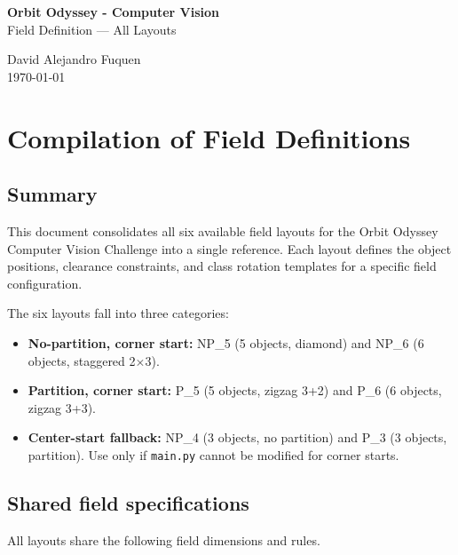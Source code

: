 \documentclass[a4]{article}
\begin{document}
\thispagestyle{fancy}

\begin{center}
    \textbf{\large Orbit Odyssey - Computer Vision} \\
    {Field Definition --- All Layouts}

    \vspace{0.7em}

    David Alejandro Fuquen \\

    {\small \today}

\end{center}

\section*{Compilation of Field Definitions}

\subsection*{Summary}

This document consolidates all six available field layouts for the Orbit Odyssey Computer Vision Challenge into a single reference. Each layout defines the object positions, clearance constraints, and class rotation templates for a specific field configuration.

The six layouts fall into three categories:

\begin{itemize}
    \item \textbf{No-partition, corner start:} NP\_5 (5 objects, diamond) and NP\_6 (6 objects, staggered 2$\times$3).
    \item \textbf{Partition, corner start:} P\_5 (5 objects, zigzag 3+2) and P\_6 (6 objects, zigzag 3+3).
    \item \textbf{Center-start fallback:} NP\_4 (3 objects, no partition) and P\_3 (3 objects, partition). Use only if \texttt{main.py} cannot be modified for corner starts.
\end{itemize}

\subsection*{Shared field specifications}

All layouts share the following field dimensions and rules.
\end{document}
